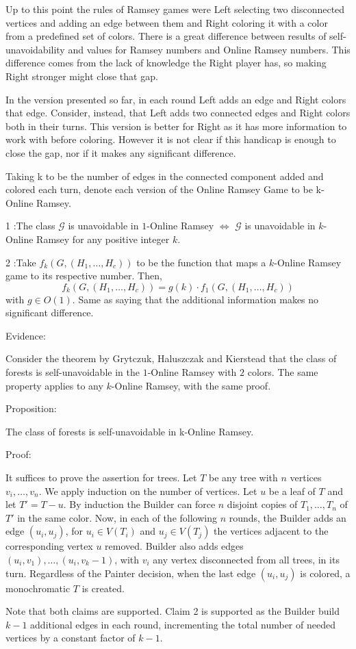 Up to this point the rules of Ramsey games were Left selecting two disconnected vertices and adding an edge between them and Right coloring it with a color from a predefined set of colors. There is a great difference between results of self-unavoidability and values for Ramsey numbers and Online Ramsey numbers. This difference comes from the lack of knowledge the Right player has, so making Right stronger might close that gap.

In the version presented so far, in each round Left adds an edge and Right colors that edge. Consider, instead, that Left adds two connected edges and Right colors both in their turns. This version is better for Right as it has more information to work with before coloring. However it is not clear if this handicap is enough to close the gap, nor if it makes any significant difference.

Taking k to be the number of edges in the connected component added and colored each turn, denote each version of the Online Ramsey Game to be k-Online Ramsey.

\begin{claim} {1}
:The class $\mathcal{G}$ is unavoidable in $1$-Online Ramsey $\iff$ $\mathcal{G}$ is unavoidable in $k$-Online Ramsey for any positive integer $k$.
\end{claim}
\begin{claim} {2}
:Take $f_k(G, (H_1, \ldots, H_c))$ to be the function that maps a $k$-Online Ramsey game to its respective number. Then, 
$$f_k(G, (H_1, \ldots, H_c)) = g(k) \cdot f_1(G, (H_1, \ldots, H_c))$$
with \mbox{$g \in O(1)$}. Same as saying that the additional information makes no significant difference.
\end{claim}

Evidence:

Consider the theorem by Grytczuk, Haluszczak and Kierstead that the class of forests is self-unavoidable in the $1$-Online Ramsey with $2$ colors. The same property applies to any $k$-Online Ramsey, with the same proof.

Proposition:

The class of forests is self-unavoidable in k-Online Ramsey.

Proof:

It suffices to prove the assertion for trees. Let $T$ be any tree with $n$ vertices $v_i, \ldots, v_n$. We apply induction on the number of vertices. Let $u$ be a leaf of $T$ and let $T' = T - u$. By induction the Builder can force $n$ disjoint copies of $T_1, \ldots, T_n$ of $T'$ in the same color.
Now, in each of the following $n$ rounds, the Builder adds an edge $(u_i, u_j)$, for $u_i \in V(T_i)$ and $u_j \in V(T_j)$ the vertices adjacent to the corresponding vertex $u$ removed. Builder also adds edges $(u_i, v_1), \ldots, (u_i, v_k-1)$, with $v_i$ any vertex disconnected from all trees, in its turn. Regardless of the Painter decision, when the last edge $(u_i, u_j)$ is colored, a monochromatic $T$ is created.

Note that both claims are supported. Claim 2 is supported as the Builder build $k-1$ additional edges in each round, incrementing the total number of needed vertices by a constant factor of $k-1$.


